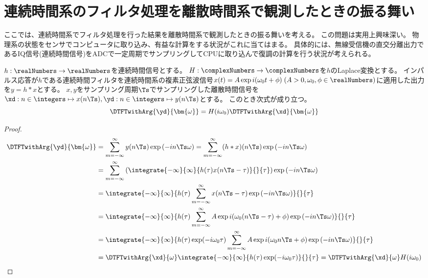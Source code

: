 \section{連続時間系のフィルタ処理を離散時間系で観測したときの振る舞い}
    ここでは、連続時間系でフィルタ処理を行った結果を離散時間系で観測したときの振る舞いを考える。
    この問題は実用上興味深い。
    物理系の状態をセンサでコンピュータに取り込み、有益な計算をする状況がこれに当てはまる。
    具体的には、無線受信機の直交分離出力であるIQ信号(連続時間信号)をADCで一定周期でサンプリングしてCPUに取り込んで復調の計算を行う状況が考えられる。
    \begin{shadebox}
        $h:\realNumbers\to\realNumbers$を連続時間信号とする。
        $H:\complexNumbers\to\complexNumbers$を$h$のLaplace変換とする。
        インパルス応答が$h$である連続時間フィルタを連続時間系の複素正弦波信号$x(t) = A\exp i(\omega_0 t + \phi)\;(A>0,\omega_0,\phi\in\realNumbers)$に適用した出力を$y=h*x$とする。
        $x,y$をサンプリング周期$\Ts$でサンプリングした離散時間信号を$\xd: n\in\integers\mapsto x(n\Ts), \yd: n\in\integers\mapsto y(n\Ts)$とする。
        このとき次式が成り立つ。
        \[ \DTFTwithArg{\yd}{\bm{\omega}} = H(i\omega_0)\DTFTwithArg{\xd}{\bm{\omega}} \]
    \end{shadebox}
    \begin{proof}
        \begin{align*}
            \DTFTwithArg{\yd}{\bm{\omega}} &= \sum_{m=-\infty}^\infty y(n\Ts)\exp \left(-i n\Ts\omega\right) = \sum_{m=-\infty}^\infty (h*x)(n\Ts)\exp \left(-i n\Ts\omega\right) \\
            &= \sum_{m=-\infty}^\infty \left(\integrate{-\infty}{\infty}{h(\tau)x(n\Ts-\tau)}{}{\tau}\right)\exp \left(-i n\Ts\omega\right) \\
            &= \integrate{-\infty}{\infty}{h(\tau)\sum_{m=-\infty}^\infty x(n\Ts-\tau)\exp \left(-i n\Ts\omega\right)}{}{\tau} \\
            &= \integrate{-\infty}{\infty}{h(\tau)\sum_{m=-\infty}^\infty A\exp i(\omega_0 (n\Ts-\tau) + \phi)\exp \left(-i n\Ts\omega\right)}{}{\tau} \\
            &= \integrate{-\infty}{\infty}{h(\tau) \exp(-i\omega_0\tau)\sum_{m=-\infty}^\infty A\exp i(\omega_0 n\Ts + \phi)\exp \left(-i n\Ts\omega\right)}{}{\tau} \\
            &= \DTFTwithArg{\xd}{\omega} \integrate{-\infty}{\infty}{h(\tau) \exp(-i\omega_0\tau)}{}{\tau} = \DTFTwithArg{\xd}{\omega}H(i\omega_0)
        \end{align*}
    \end{proof}